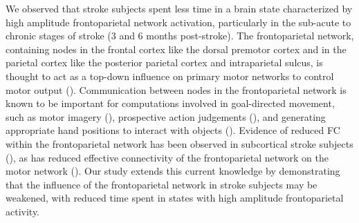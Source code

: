 \documentclass[phd,tocprelim]{cornell}
\begin{document}
    We observed that stroke subjects spent less time in a brain state characterized by high amplitude frontoparietal network activation, particularly in the sub-acute to chronic stages of stroke (3 and 6 months post-stroke). The frontoparietal network, containing nodes in the frontal cortex like the dorsal premotor cortex and in the parietal cortex like the posterior parietal cortex and intraparietal sulcus, is thought to act as a top-down influence on primary motor networks to control motor output (\cite{Marek2018-ql}). Communication between nodes in the frontoparietal network is known to be important for computations involved in goal-directed movement, such as motor imagery (\cite{Oostra2016-ki}), prospective action judgements (\cite{Geers2021-pz}), and generating appropriate hand positions to interact with objects (\cite{Borra2017-aj}). Evidence of reduced FC within the frontoparietal network has been observed in subcortical stroke subjects (\cite{Wang2014-vi}), as has reduced effective connectivity of the frontoparietal network on the motor network (\cite{Inman2012-tq}). Our study extends this current knowledge by demonstrating that the influence of the frontoparietal network in stroke subjects may be weakened, with reduced time spent in states with high amplitude frontoparietal activity.
    
\end{document}
